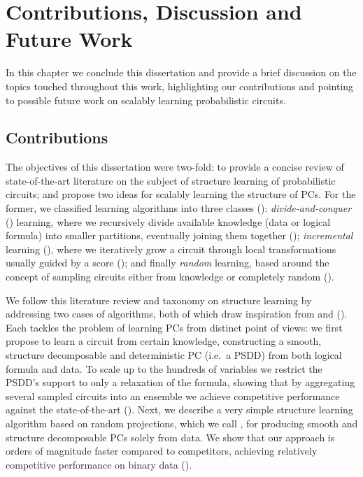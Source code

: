 \chapter{Contributions, Discussion and Future Work}
\label{ch:conclusion}

In this chapter we conclude this dissertation and provide a brief discussion on the topics touched
throughout this work, highlighting our contributions and pointing to possible future work on
scalably learning probabilistic circuits.

\section{Contributions}

The objectives of this dissertation were two-fold: to provide a concise review of state-of-the-art
literature on the subject of structure learning of probabilistic circuits; and propose two ideas
for scalably learning the structure of PCs. For the former, we classified learning algorithms into
three classes (): \emph{divide-and-conquer} (\divclass{}) learning, where we
recursively divide available knowledge (data or logical formula) into smaller partitions,
eventually joining them together (); \emph{incremental} learning (\incrclass{}),
where we iteratively grow a circuit through local transformations usually guided by a score
(); and finally \emph{random} learning, based around the concept of sampling
circuits either from knowledge or completely random ().

We follow this literature review and taxonomy on structure learning by addressing two cases of
\randclass{} algorithms, both of which draw inspiration from \divclass{} and \incrclass{}
(). Each tackles the problem of learning PCs from distinct point of views:
we first propose  to learn a circuit from certain knowledge, constructing a
smooth, structure decomposable and deterministic PC (i.e.\ a PSDD) from both logical formula and
data. To scale up to the hundreds of variables we restrict the PSDD's support to only a relaxation
of the formula, showing that by aggregating several sampled circuits into an ensemble we achieve
competitive performance against the state-of-the-art (). Next, we describe a very
simple \randclass{} structure learning algorithm based on random projections, which we call
, for producing smooth and structure decomposable PCs solely from data. We show
that our approach is orders of magnitude faster compared to competitors, achieving relatively
competitive performance on binary data ().

